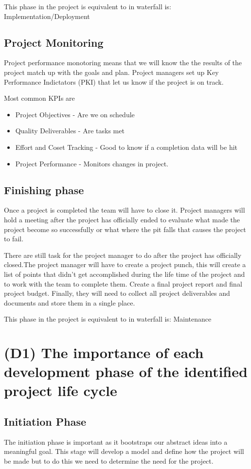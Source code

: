 \documentclass{article}
\begin{document}
This phase in the project is equivalent to in waterfall is: Implementation/Deployment

\subsection{Project Monitoring}
Project performance monotoring means that we will know the the results of the project match up with the goals and plan.
Project managers set up Key Performance Indictators (PKI) that let us know if the project is on track.

Most common KPIs are
\begin{itemize}
    \item Project Objectives - Are we on schedule
    \item Quality Deliverables - Are tasks met
    \item Effort and Coset Tracking - Good to know if a completion data will be hit
    \item Project Performance - Monitors changes in project.
\end{itemize}

\subsection{Finishing phase}

Once a project is completed the team will have to close it. Project managers will hold a meeting after the project has officially ended to evaluate what made the project become so successfully or what where the pit falls that causes the project to fail.

There are still task for the project manager to do after the project has officially closed.The project manager will have to create a project punch, this will create a list of points that didn't get accomplished during the life time of the project and to work with the team to complete them. Create a final project report and final project budget. Finally, they will need to collect all project deliverables and  documents and store them in a single place.

This phase in the project is equivalent to in waterfall is: Maintenance

\break
\section{(D1) The importance of each development phase of the identified project life cycle}

\subsection{Initiation Phase}
The initiation phase is important as it bootstraps our abstract ideas into a meaningful goal. This stage will develop a model and define how the project will be made but to do this we need to determine the need for the project.
\end{document}
